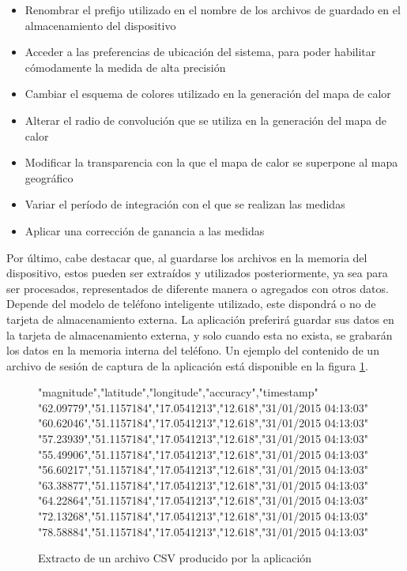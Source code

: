     \begin{itemize}
    \item Renombrar el prefijo utilizado en el nombre de los archivos de guardado en el almacenamiento del dispositivo
    \item Acceder a las preferencias de ubicación del sistema, para poder habilitar cómodamente la medida de alta precisión
    \item Cambiar el esquema de colores utilizado en la generación del mapa de calor
    \item Alterar el radio de convolución que se utiliza en la generación del mapa de calor
    \item Modificar la transparencia con la que el mapa de calor se superpone al mapa geográfico
    \item Variar el período de integración con el que se realizan las medidas
    \item Aplicar una corrección de ganancia a las medidas
    \end{itemize}
    
    Por último, cabe destacar que, al guardarse los archivos en la memoria del dispositivo, estos pueden ser extraídos y utilizados posteriormente, ya sea para ser procesados, representados de diferente manera o agregados con otros datos. Depende del modelo de teléfono inteligente utilizado, este dispondrá o no de tarjeta de almacenamiento externa. La aplicación preferirá guardar sus datos en la tarjeta de almacenamiento externa, y solo cuando esta no exista, se grabarán los datos en la memoria interna del teléfono. Un ejemplo del contenido de un archivo de sesión de captura de la aplicación está disponible en la figura \ref{fig:dump:file}.
    
\begin{figure}[h] \centering
\begin{boxedverbatim}
"magnitude","latitude","longitude","accuracy","timestamp"
"62.09779","51.1157184","17.0541213","12.618","31/01/2015 04:13:03"
"60.62046","51.1157184","17.0541213","12.618","31/01/2015 04:13:03"
"57.23939","51.1157184","17.0541213","12.618","31/01/2015 04:13:03"
"55.49906","51.1157184","17.0541213","12.618","31/01/2015 04:13:03"
"56.60217","51.1157184","17.0541213","12.618","31/01/2015 04:13:03"
"63.38877","51.1157184","17.0541213","12.618","31/01/2015 04:13:03"
"64.22864","51.1157184","17.0541213","12.618","31/01/2015 04:13:03"
"72.13268","51.1157184","17.0541213","12.618","31/01/2015 04:13:03"
"78.58884","51.1157184","17.0541213","12.618","31/01/2015 04:13:03"
\end{boxedverbatim}
\caption{Extracto de un archivo CSV producido por la aplicación}
\label{fig:dump:file}
\end{figure}

